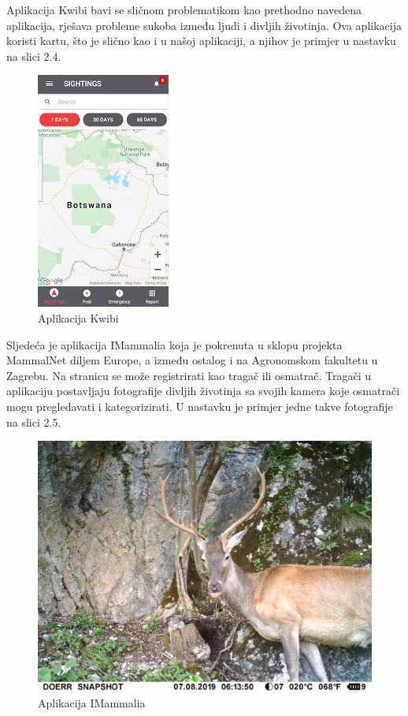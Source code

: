 		Aplikacija Kwibi bavi se sličnom problematikom kao prethodno navedena aplikacija, rješava probleme sukoba između ljudi i divljih životinja. Ova aplikacija koristi kartu, što je slično kao i u našoj aplikaciji, a njihov je primjer u nastavku na slici 2.4.
		
		\begin{figure}[H]
			\includegraphics[scale=0.75]{slike/primjera2.JPG} %
			\centering
			\caption{Aplikacija Kwibi}
			\label{fig:kwibi} %
		\end{figure}
		
		Sljedeća je aplikacija IMammalia koja je pokrenuta u sklopu projekta MammalNet diljem Europe, a između ostalog i na Agronomskom fakultetu u Zagrebu. Na stranicu se može registrirati kao tragač ili osmatrač. Tragači u aplikaciju postavljaju fotografije divljih životinja sa svojih kamera koje osmatrači mogu pregledavati i kategorizirati. U nastavku je primjer jedne takve fotografije na slici 2.5.
		
		\begin{figure}[H]
			\includegraphics[scale=0.75]{slike/primjera3.JPG} %
			\centering
			\caption{Aplikacija IMammalia}
			\label{fig:mammal} %
		\end{figure}
		

